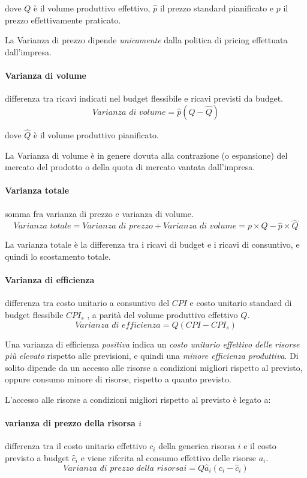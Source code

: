 dove $Q$ \`e il volume produttivo effettivo, $\hat{p}$ il prezzo standard pianificato e $p$ il prezzo effettivamente praticato.

La Varianza di prezzo dipende \emph{unicamente} dalla politica di pricing effettuata dall’impresa.

\paragraph{Varianza di volume} differenza tra ricavi indicati nel budget flessibile e ricavi previsti da budget.
\[
	\textit{Varianza di volume} = \hat{p} \left(Q - \hat{Q}\right)
\]

dove $\hat{Q}$ \`e il volume produttivo pianificato.

La Varianza di volume è in genere dovuta alla contrazione (o espansione) del mercato del prodotto o della quota di mercato vantata dall’impresa.

\paragraph{Varianza totale} somma fra varianza di prezzo e varianza di volume.
\[
	\textit{Varianza totale} = \textit{Varianza di prezzo} + \textit{Varianza di volume} = p \times Q - \hat{p} \times \hat{Q}
\]

La varianza totale è la differenza tra i ricavi di budget e i ricavi di consuntivo, e quindi lo scostamento totale.

\paragraph{Varianza di efficienza} differenza tra costo unitario a consuntivo del $CPI$ e costo
unitario standard di budget flessibile $CPI_s$ , a parità del volume produttivo effettivo $Q$.
\[
	\textit{Varianza di efficienza} = Q \left(CPI - CPI_s\right)
\]

Una varianza di efficienza \emph{positiva} indica un \emph{costo unitario effettivo delle risorse più
elevato} rispetto alle previsioni, e quindi una \emph{minore efficienza produttiva}. Di solito dipende da un accesso alle risorse a
condizioni migliori
rispetto al previsto, oppure consumo minore di
risorse, rispetto a quanto
previsto.

L’accesso alle risorse a condizioni migliori rispetto al previsto è legato a:

\paragraph{varianza di prezzo della risorsa $i$} differenza tra il costo unitario effettivo $c_i$ della generica risorsa $i$ e il costo previsto a budget $\hat{c}_i$ e viene riferita al consumo effettivo
delle risorse $a_i$.
\[
\textit{Varianza di prezzo della risorsa} i = Q \hat{a}_i \left(c_i - \hat{c}_i\right)
\]


